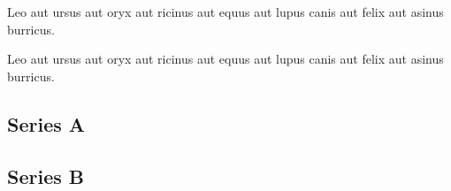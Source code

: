 \documentclass[draft]{article}
\begin{document}
\begin{pages}
\begin{Leftside}
\beginnumbering
\pstart
Leo {aut} ursus {aut} oryx {aut} ricinus {aut} equus {aut}
lupus  canis {aut} felix {aut} asinus  burricus.

\pend
\endnumbering
\end{Leftside}

\begin{Rightside}
\beginnumbering
\pstart
Leo {aut} ursus {aut} oryx {aut} ricinus {aut} equus {aut}
lupus  canis {aut} felix {aut} asinus  burricus.

\pend
\endnumbering
\end{Rightside}
\end{pages}
\Pages
\subsection*{Series A}
\subsection*{Series B}
\end{document}
